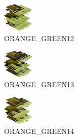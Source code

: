 \hspace{0.1cm}
\begin{minipage}[b]{0.15\linewidth}
\begin{figure}[H]                                                          
  \centering                                                             
  \begin{adjustbox}{width=1.5cm,center}                                   
  \includegraphics[width=1.5cm]{src/colorspace_colourflow/flows/colourflow_236-45.png}%
  \end{adjustbox}                                                        
\caption*{ORANGE\_GREEN12}                                           
\end{figure}                                                               
\end{minipage}
\hspace{0.1cm}
\begin{minipage}[b]{0.15\linewidth}
\begin{figure}[H]                                                          
  \centering                                                             
  \begin{adjustbox}{width=1.5cm,center}                                   
  \includegraphics[width=1.5cm]{src/colorspace_colourflow/flows/colourflow_237-45.png}%
  \end{adjustbox}                                                        
\caption*{ORANGE\_GREEN13}                                           
\end{figure}                                                               
\end{minipage}
\hspace{0.1cm}
\begin{minipage}[b]{0.15\linewidth}
\begin{figure}[H]                                                          
  \centering                                                             
  \begin{adjustbox}{width=1.5cm,center}                                   
  \includegraphics[width=1.5cm]{src/colorspace_colourflow/flows/colourflow_238-45.png}%
  \end{adjustbox}                                                        
\caption*{ORANGE\_GREEN14}                                           
\end{figure}                                                               
\end{minipage}
